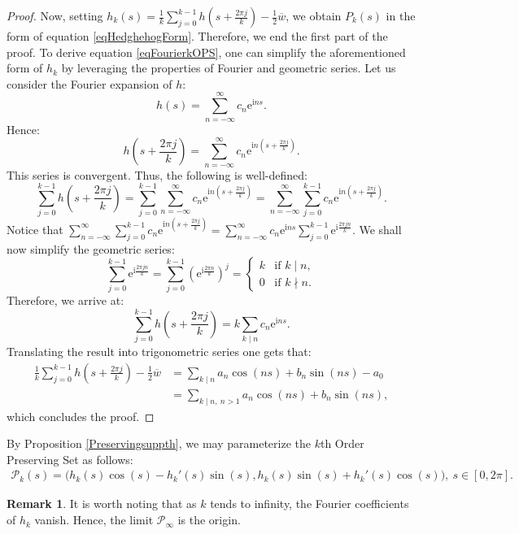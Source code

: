 \documentclass{amsart}
\theoremstyle{definition}
\newtheorem{rem}[thm]{Remark}
\numberwithin{equation}{section}
\newcommand{\e}{\mathrm{e}}
\renewcommand{\i}{\mathrm{i}}
\begin{document}
\begin{proof}
    
    Now, setting $h_k(s) = \frac{1}{k}\sum_{j=0}^{k-1}h\left(s+\frac{2\pi j}{k}\right) - \frac{1}{2}\overline{w}$, we obtain $P_k(s)$ in the form of equation \eqref{eqHedghehogForm}. Therefore, we end the first part of the proof. To derive equation \eqref{eqFourierkOPS}, one can simplify the aforementioned form of $h_k$ by leveraging the properties of Fourier and geometric series. Let us consider the Fourier expansion of $h$:
    $$h(s) = \sum_{n=-\infty}^\infty c_n{\e}^{\i ns}.$$
    Hence:
     $$h\left(s+\frac{2\pi j}{k}\right) = \sum_{n=-\infty}^\infty c_n{\e}^{\i n\left(s+\frac{2\pi j}{k}\right)}.$$
     This series is convergent. Thus, the following is well-defined:
     $$\sum_{j=0}^{k-1}h\left(s+\frac{2\pi j}{k}\right) = \sum_{j=0}^{k-1}\sum_{n=-\infty}^\infty c_n{\e}^{\i n\left(s+\frac{2\pi j}{k}\right)}=\sum_{n=-\infty}^\infty \sum_{j=0}^{k-1} c_n{\e}^{\i n\left(s+\frac{2\pi j}{k}\right)}.$$ Notice that $\sum_{n=-\infty}^\infty \sum_{j=0}^{k-1} c_n{\e}^{\i n\left(s+\frac{2\pi j}{k}\right)} = \sum_{n=-\infty}^\infty c_n{\e}^{\i ns}\sum_{j=0}^{k-1} {\e}^{\i\frac{2\pi jn}{k}}$. We shall now simplify the geometric series:
     $$\sum_{j=0}^{k-1} {\e}^{\i\frac{2\pi jn}{k}} = \sum_{j=0}^{k-1} \left({\e}^{\i\frac{2\pi n}{k}}\right)^j = \begin{cases} 
k & \text{if } k\mid n, \\ 
0 & \text{if } k\nmid n. 
\end{cases}$$ Therefore, we arrive at:
$$\sum_{j=0}^{k-1}h\left(s+\frac{2\pi j}{k}\right) = k\sum_{k\mid n} c_n{\e}^{\i ns}.$$ Translating the result into trigonometric series one gets that:
\begin{align*}
\frac{1}{k}\sum_{j=0}^{k-1}h\left(s+\frac{2\pi j}{k}\right) - \frac{1}{2}\overline{w} &= \sum_{k \mid n} a_n\cos(ns) + b_n\sin(ns) - a_0\\ &= \sum_{k \mid n,\ n > 1}a_n\cos(ns) + b_n\sin(ns),
\end{align*}
which concludes the proof.
    \end{proof}
    
By Proposition \ref{Preservingsuppth}, we may parameterize the $k$th Order Preserving Set as follows:
\begin{align}
    \label{eq:pkparameterization}\mathcal{P}_k(s)= \Big( h_k(s) \cos(s) - h_k'(s) \sin(s),  h_k(s) \sin(s) + h_k'(s) \cos(s) \Big),\ s\in[0,2\pi].
\end{align}

\begin{rem}\label{remSteiBall}
    It is worth noting that as $k$ tends to infinity, the Fourier coefficients of $h_k$ vanish. Hence, the limit $\mathcal{P}_\infty$ is the origin.
\end{rem}
\end{document}
